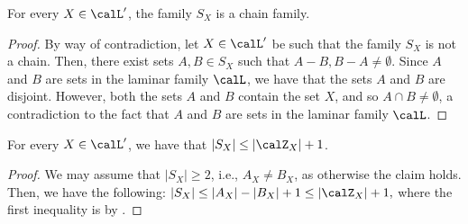 \begin{claim}\label{claim:Laminar-family-projection:S_X-is-a-chain}
        For every $X \in\calL'$, the family $S_X$ is a chain family.
    \end{claim}
    \begin{proof}
        By way of contradiction, let $X \in \calL'$ be such that the family $S_X$ is not a chain. Then, there exist sets $A, B \in S_X$ such that $A - B, B - A \not = \emptyset$. Since $A$ and $B$ are sets in the laminar family $\calL$, we have that the sets $A$ and $B$ are disjoint. However, both the sets $A$ and $B$ contain the set $X$, and so $A\cap B \not = \emptyset$, a contradiction to the fact that $A$ and $B$ are sets in the laminar family $\calL$.
    \end{proof}

\begin{claim}\label{claim:Laminar-family-projection:|S_X|-atmost-|Z_X|+1}
    For every $X \in \calL'$, we have that $|S_X| \leq |\calZ_{X}| + 1$.
\end{claim}
\begin{proof}
    We may assume that $|S_X| \geq 2$, i.e.,  $A_X \not = B_X$, as otherwise the claim holds. Then, we have the following:
    $|S_X| \leq |A_X| - |B_X| + 1 \leq |\calZ_X| +1,$ where the first inequality is by .
\end{proof}

